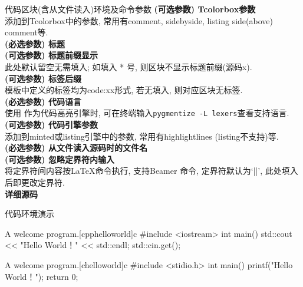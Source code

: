 \begin{frame}{代码区块(含从文件读入)环境及命令参数}
	\alert{}\hfill \textbf{(可选参数) Tcolorbox参数}\\
	添加到Tcolorbox中的参数, 常用有comment, sidebyside, listing side(above) comment等.\\

	\alert{}\hfill \textbf{(必选参数) 标题}\\

	\alert{}\hfill \textbf{(可选参数) 标题前缀显示}\\
	此处默认留空无需填入; 如填入 * 号, 则区块不显示标题前缀(源码x).\\

	\alert{}\hfill \textbf{(可选参数) 标签后缀}\\
	模板中定义的标签均为code:xx形式, 若无填入, 则对应区块无标签.\\

	\alert{}\hfill \textbf{(必选参数) 代码语言}\\
	使用  作为代码高亮引擎时, 可在终端输入\texttt{pygmentize -L lexers}查看支持语言.\\

	\alert{}\hfill \textbf{(可选参数) 代码引擎参数}\\
	添加到minted或listing引擎中的参数, 常用有highlightlines (listing不支持)等.\\

	\alert{}\hfill \textbf{(必选参数) 从文件读入源码时的文件名}\\

	\alert{}\hfill \textbf{(可选参数) 忽略定界符内输入}\\
	将定界符间内容按\LaTeX{}命令执行, 支持Beamer 命令, 定界符默认为`||', 此处填入后即更改定界符.\\

	\alert{}\hfill \textbf{详细源码}
\end{frame}

\begin{frame}[fragile]{代码环境演示}
	\onslide<2>
	\begin{scucode}{A welcome program.}[cpphelloworld]{c}
		#include <iostream>
		int main()
		{
			std::cout << "Hello World！" << std::endl;
			std::cin.get();
		}
	\end{scucode}
	\begin{scucode}{A welcome program.}[chelloworld]{c}
		#include <stidio.h>
		int main()
		{
			printf("Hello World！");
			return 0;
		}
	\end{scucode}
\end{frame}

